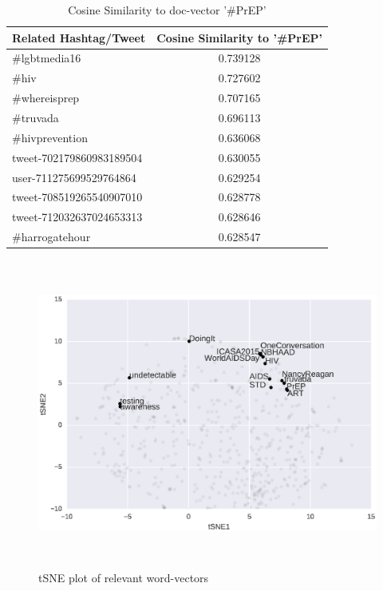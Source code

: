 \documentclass{sig-alternate-05-2015}
\begin{document}
\begin{table}
\centering
\caption{Cosine Similarity to doc-vector '\#PrEP'}
\begin{tabular}{|l|c|} \hline
Related Hashtag/Tweet & Cosine Similarity to '\#PrEP'\\ \hline
\#lgbtmedia16 & 0.739128\\ \hline
\#hiv & 	0.727602 \\ \hline
\#whereisprep & 0.707165 \\ \hline
\#truvada & 0.696113 \\ \hline
\#hivprevention & 0.636068 \\ \hline
tweet-702179860983189504 & 0.630055\\ \hline
user-711275699529764864 & 0.629254\\ \hline
tweet-708519265540907010 & 0.628778 \\ \hline
tweet-712032637024653313 & 0.628646 \\ \hline
\#harrogatehour & 0.628547 \\ \hline
\hline\end{tabular}
\end{table}


\begin{figure}
\centering
\includegraphics[height=4in, width=6in]{tSNE_word}
\caption{tSNE plot of relevant word-vectors}
\end{figure}
\end{document}
